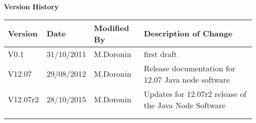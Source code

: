 {\begin{titlepage}
\end{titlepage}

\noindent \textbf{Version History}

\textbf{}

\noindent \begin{tabular}{|l|l|l|l|} 
\hline 
\textbf{Version} & \textbf{Date} & \textbf{Modified By} & \textbf{Description of Change} \\ \hline 
V0.1 & 31/10/2011 & M.Doronin & first draft \\ \hline 
V12.07 & 29/08/2012 & M.Doronin & Release documentation for 12.07 Java node software \\ \hline 
V12.07r2 & 28/10/2015 & M.Doronin & Updates for 12.07r2 release of the Java Node Software \\ \hline
 &  &  &  \\ \hline 
 &  &  &  \\ \hline 
\end{tabular}



}